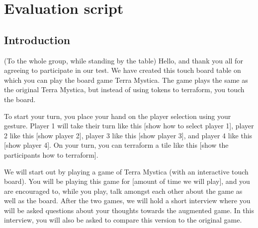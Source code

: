 \chapter{Evaluation script}\label{ch:TestScript}
\section{Introduction}
(To the whole group, while standing by the table)
Hello, and thank you all for agreeing to participate in our test. We have created this touch board table on which you can play the board game Terra Mystica. The game plays the same as the original Terra Mystica, but instead of using tokens to terraform, you touch the board.

To start your turn, you place your hand on the player selection using your gesture. Player 1 will take their turn like this [show how to select player 1], player 2 like this [show player 2], player 3 like this [show player 3], and player 4 like this [show player 4]. On your turn, you can terraform a tile like this [show the participants how to terraform].

We will start out by playing a game of Terra Mystica (with an interactive touch board). You will be playing this game for [amount of time we will play], and you are encouraged to, while you play, talk amongst each other about the game as well as the board. After the two games, we will hold a short interview where you will be asked questions about your thoughts towards the augmented game. In this interview, you will also be asked to compare this version to the original game.


